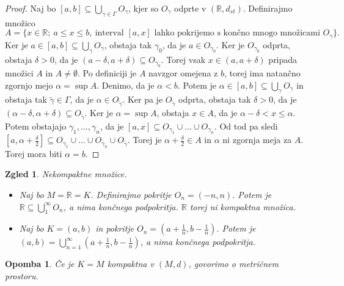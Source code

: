\documentclass[10pt, a4paper]{article}
\newtheorem*{opomba}{Opomba}
\newtheorem{zgled}{Zgled}[section]
\newenvironment{noticeC}{%
  \tcolorbox[%
  notitle,
  empty,
  enhanced,  %
  breakable,
  coltext=black, 
  fontupper=\rmfamily,
  parbox=false,
  noparskip,
  sharp corners,
  boxrule=-1pt,  %
  frame hidden,
  left=7pt,  %
  right=7pt,
  top=5pt,
  bottom=5pt,
  before skip=2.5ex plus 2pt,
  after skip=2.5ex plus 2pt,
  overlay unbroken and last={%
  },
  ]}
{\endtcolorbox}
\newenvironment{dokaz}%
  {\begin{noticeC}\begin{proof}}%
  {\end{proof}\end{noticeC}}
\newcommand{\R}{\mathbb {R}}
\begin{document}
\begin{dokaz}
    Naj bo $[a, b] \subseteq \bigcup_{\gamma \in \Gamma} O_\gamma$, kjer so $O_\gamma$ odprte v $(\R, d_{st})$.
    Definirajmo množico $$A = \{x \in \R;\ a \leq x \leq b,\ \text{interval $[a,x]$ lahko pokrijemo s končno mnogo množicami $O_\gamma$}\}.$$
    Ker je $a \in [a, b] \subseteq \bigcup_{\gamma} O_\gamma$, obstaja tak $\gamma_0$, da je $a \in O_{\gamma_0}$.
    Ker je $O_{\gamma_0}$ odprta, obstaja $\delta > 0$, da je $(a- \delta, a+ \delta) \subseteq O_{\gamma_0}$.
    Torej vsak $x \in (a, a+ \delta)$ pripada množici $A$ in $A \neq \emptyset$.
    Po definiciji je $A$ navzgor omejena z $b$, torej ima natančno zgornjo mejo $\alpha = \sup A$.
    Denimo, da je $\alpha < b.$ Potem je $\alpha \in [a, b] \subseteq \bigcup_{\gamma} O_\gamma$ in obstaja tak $\tilde{\gamma} \in \Gamma$,
    da je $\alpha \in O_{\tilde{\gamma}}$. Ker pa je $O_{\tilde{\gamma}}$ odprta, obstaja tak $\delta > 0$, da je $(\alpha - \delta, \alpha + \delta) \subseteq O_{\tilde{\gamma}}$.
    Ker je $\alpha = \sup A$, obstaja $x \in A$, da je $\alpha - \delta < x \leq \alpha.$
    Potem obstajajo $\gamma_1, \dots, \gamma_n$, da je $[a, x] \subseteq O_{\gamma_1} \cup \dots \cup O_{\gamma_n}$.
    Od tod pa sledi $[a, \alpha + \frac{\delta}{2}] \subseteq O_{\gamma_1} \cup \dots \cup O_{\gamma_n} \cup O_{\tilde{\gamma}}$.
    Torej je $\alpha + \frac{\delta}{2} \in A$ in $\alpha$ ni zgornja meja za $A$.
    Torej mora biti $\alpha = b.$
\end{dokaz}

\begin{zgled}
    Nekompaktne množice.
    \begin{itemize}
        \item Naj bo $M = \R = K$. Definirajmo pokritje $O_n = (-n, n)$.
        Potem je $\R \subseteq \bigcup_{1} ^\infty O_n$, a nima končnega podpokritja.
        $\R$ torej ni kompaktna množica.
        \item Naj bo $K = (a, b)$ in pokritje $O_n = \left(a+ \frac{1}{n}, b- \frac{1}{n}\right)$.
        Potem je $(a, b) = \bigcup_{n = 1} ^\infty \left(a + \frac{1}{n}, b - \frac{1}{n}\right)$, a nima končnega podpokritja.
    \end{itemize}
\end{zgled}

\begin{opomba}
    Če je $K = M$ kompaktna v $(M, d)$, govorimo o metričnem prostoru.
\end{opomba}
\end{document}
